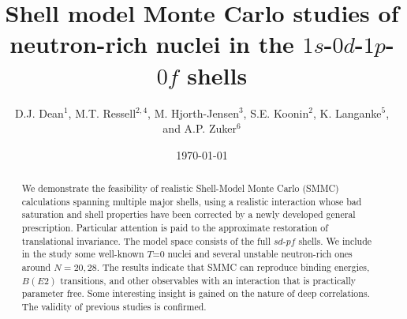 \def\mg32{$^{32}$Mg}
\def\hw{$\hbar\omega\,$}
\def\hcm{${H}_{CM}\,$}
\def\ham{${H}\,$}

\draft
\tighten
\title{Shell model Monte Carlo studies of neutron-rich nuclei
in the $1s$-$0d$-$1p$-$0f$ shells}
\author{D.J. Dean$^1$, M.T. Ressell$^{2,4}$,
M. Hjorth-Jensen$^3$, S.E. Koonin$^2$, K. Langanke$^5$, \\ and A.P. Zuker$^6$}
\address{
$^1$Physics Division, Oak Ridge National Laboratory, P.O. Box 2008\\
Oak Ridge, Tennessee 37831 USA and Department of Physics and \\
Astronomy, University of Tennessee, Knoxville, Tennessee, 37996 \\
$^2$W.K. Kellogg Radiation Laboratory, 106-38, California
Institute of Technology \\
Pasadena, California 91125 USA \\
$^3$Nordita, Blegdamsvej 17, DK-2100 Copenhagen \O, Denmark and\\
    Department of Physics, University of Oslo, Norway\\
$^4$Astronomy and Astrophysics Center, University of Chicago \\
5640 S. Ellis Ave., Chicago, IL 60637 \\
$^5$Institute for Physics and Astronomy, Aarhus University, Denmark\\
$^6$IRES, B\^at27, IN2P3-CNRS/Universit\'e Louis
Pasteur BP 28, \\ F-67037 Strasbourg Cedex 2, France}
\date{\today}
\maketitle
\begin{abstract}

We demonstrate the feasibility of realistic Shell-Model Monte Carlo
(SMMC) calculations spanning multiple major shells, using a
realistic interaction whose bad saturation and shell properties
have been corrected by a newly developed general prescription.
Particular attention is paid to the approximate restoration of
translational invariance. The model space consists of the full
$sd$-$pf$ shells. We include in the study some well-known $T$=0
nuclei and several unstable neutron-rich ones around $N = 20,28$.
The results indicate that SMMC can reproduce binding
energies, $B(E2)$ transitions, and other observables with an
interaction that is practically parameter free. Some interesting
insight is gained on the nature of deep correlations.
The validity of previous studies is confirmed.

\end{abstract}

